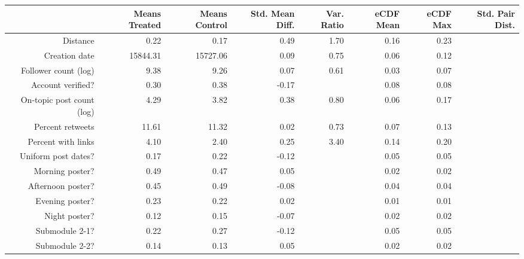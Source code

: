 \begin{table}[ht]
\centering
\begin{tabular}{rrrrrrrr}
  & Means Treated & Means Control & Std. Mean Diff. & Var. Ratio & eCDF Mean & eCDF Max & Std. Pair Dist. \\ 
  \hline
Distance & 0.22 & 0.17 & 0.49 & 1.70 & 0.16 & 0.23 &  \\ 
   \hline
Creation date & 15844.31 & 15727.06 & 0.09 & 0.75 & 0.06 & 0.12 &  \\ 
   \hline
Follower count (log) & 9.38 & 9.26 & 0.07 & 0.61 & 0.03 & 0.07 &  \\ 
   \hline
Account verified? & 0.30 & 0.38 & -0.17 &  & 0.08 & 0.08 &  \\ 
   \hline
On-topic post count (log) & 4.29 & 3.82 & 0.38 & 0.80 & 0.06 & 0.17 &  \\ 
   \hline
Percent retweets & 11.61 & 11.32 & 0.02 & 0.73 & 0.07 & 0.13 &  \\ 
   \hline
Percent with links & 4.10 & 2.40 & 0.25 & 3.40 & 0.14 & 0.20 &  \\ 
   \hline
Uniform post dates? & 0.17 & 0.22 & -0.12 &  & 0.05 & 0.05 &  \\ 
   \hline
Morning poster? & 0.49 & 0.47 & 0.05 &  & 0.02 & 0.02 &  \\ 
   \hline
Afternoon poster? & 0.45 & 0.49 & -0.08 &  & 0.04 & 0.04 &  \\ 
   \hline
Evening poster? & 0.23 & 0.22 & 0.02 &  & 0.01 & 0.01 &  \\ 
   \hline
Night poster? & 0.12 & 0.15 & -0.07 &  & 0.02 & 0.02 &  \\ 
   \hline
Submodule 2-1? & 0.22 & 0.27 & -0.12 &  & 0.05 & 0.05 &  \\ 
   \hline
Submodule 2-2? & 0.14 & 0.13 & 0.05 &  & 0.02 & 0.02 &  \\ 
   \hline
\end{tabular}
\end{table}

